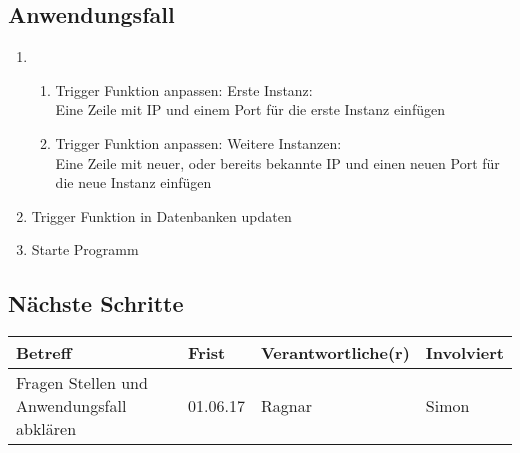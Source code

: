 \documentclass{scrartcl}
\begin{document}
\subsection{Anwendungsfall}
\begin{enumerate}
	\item 
	\begin{enumerate}
		\item Trigger Funktion anpassen: Erste Instanz:\\
		Eine Zeile mit IP und einem Port für die erste Instanz einfügen
		\item Trigger Funktion anpassen: Weitere Instanzen:\\
	Eine Zeile mit neuer, oder bereits bekannte IP und einen neuen Port für die neue Instanz einfügen
	\end{enumerate}
	
	\item Trigger Funktion in Datenbanken updaten
	\item Starte Programm
\end{enumerate}


\subsection{Nächste Schritte}
\begin{tabular}{L{.249} L{.2} L{.25} L{.25}}
Betreff & Frist & Verantwortliche(r) & Involviert\\\hline
Fragen Stellen und Anwendungsfall abklären  & 01.06.17 & Ragnar & Simon
\end{tabular}
\end{document}
